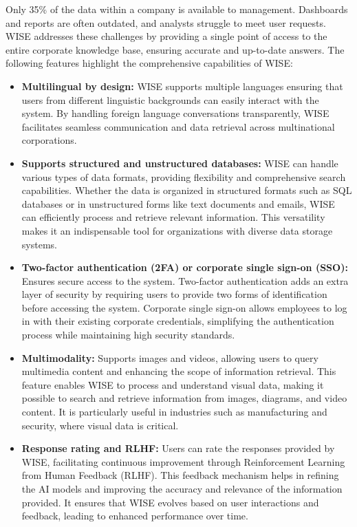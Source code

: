 Only 35\% of the data within a company is available to management. Dashboards and reports are often outdated, and analysts struggle to meet user requests. WISE addresses these challenges by providing a single point of access to the entire corporate knowledge base, ensuring accurate and up-to-date answers. The following features highlight the comprehensive capabilities of WISE:

\begin{itemize}
    \item \textbf{Multilingual by design:} WISE supports multiple languages ensuring that users from different linguistic backgrounds can easily interact with the system. By handling foreign language conversations transparently, WISE facilitates seamless communication and data retrieval across multinational corporations.
    
    \item \textbf{Supports structured and unstructured databases:} WISE can handle various types of data formats, providing flexibility and comprehensive search capabilities. Whether the data is organized in structured formats such as SQL databases or in unstructured forms like text documents and emails, WISE can efficiently process and retrieve relevant information. This versatility makes it an indispensable tool for organizations with diverse data storage systems.
    
    \item \textbf{Two-factor authentication (2FA) or corporate single sign-on (SSO):} Ensures secure access to the system. Two-factor authentication adds an extra layer of security by requiring users to provide two forms of identification before accessing the system. Corporate single sign-on allows employees to log in with their existing corporate credentials, simplifying the authentication process while maintaining high security standards.
    
    \item \textbf{Multimodality:} Supports images and videos, allowing users to query multimedia content and enhancing the scope of information retrieval. This feature enables WISE to process and understand visual data, making it possible to search and retrieve information from images, diagrams, and video content. It is particularly useful in industries such as manufacturing and security, where visual data is critical.
    
    \item \textbf{Response rating and RLHF:} Users can rate the responses provided by WISE, facilitating continuous improvement through Reinforcement Learning from Human Feedback (RLHF). This feedback mechanism helps in refining the AI models and improving the accuracy and relevance of the information provided. It ensures that WISE evolves based on user interactions and feedback, leading to enhanced performance over time.
    

\end{itemize}
